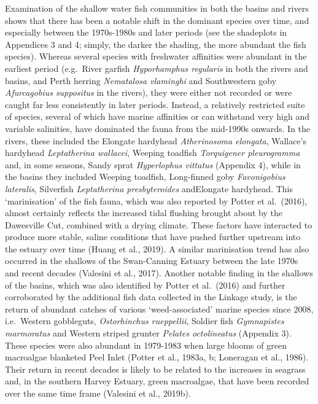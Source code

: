 \documentclass[
]{book}
\begin{document}
Examination of the shallow water fish communities in both the basins and rivers shows that there has been a notable shift in the dominant species over time, and especially between the 1970s-1980s and later periods (see the shadeplots in Appendices 3 and 4; simply, the darker the shading, the more abundant the fish species). Whereas several species with freshwater affinities were abundant in the earliest period (e.g.~River garfish \emph{Hyporhamphus regularis} in both the rivers and basins, and Perth herring \emph{Nematalosa vlaminghi} and Southwestern goby \emph{Afurcagobius suppositus} in the rivers), they were either not recorded or were caught far less consistently in later periods. Instead, a relatively restricted suite of species, several of which have marine affinities or can withstand very high and variable salinities, have dominated the fauna from the mid-1990s onwards. In the rivers, these included the Elongate hardyhead \emph{Atherinosoma elongata}, Wallace's hardyhead \emph{Leptatherina wallacei}, Weeping toadfish \emph{Torquigener pleurogramma} and, in some seasons, Sandy sprat \emph{Hyperlophus vittatus} (Appendix 4), while in the basins they included Weeping toadfish, Long-finned goby \emph{Favonigobius lateralis}, Silverfish \emph{Leptatherina presbyteroides} andElongate hardyhead. This `marinisation' of the fish fauna, which was also reported by Potter et al.~(2016), almost certainly reflects the increased tidal flushing brought about by the Dawesville Cut, combined with a drying climate. These factors have interacted to produce more stable, saline conditions that have pushed further upstream into the estuary over time (Huang et al., 2019). A similar marinisation trend has also occurred in the shallows of the Swan-Canning Estuary between the late 1970s and recent decades (Valesini et al., 2017). Another notable finding in the shallows of the basins, which was also identified by Potter et al.~(2016) and further corroborated by the additional fish data collected in the Linkage study, is the return of abundant catches of various `weed-associated' marine species since 2008, i.e.~Western gobbleguts, \emph{Ostorhinchus rueppellii}, Soldier fish \emph{Gymnapistes marmoratus} and Western striped grunter \emph{Pelates octolineatus} (Appendix 3). These species were also abundant in 1979-1983 when large blooms of green macroalgae blanketed Peel Inlet (Potter et al., 1983a, b; Loneragan et al., 1986). Their return in recent decades is likely to be related to the increases in seagrass and, in the southern Harvey Estuary, green macroalgae, that have been recorded over the same time frame (Valesini et al., 2019b).
\end{document}

